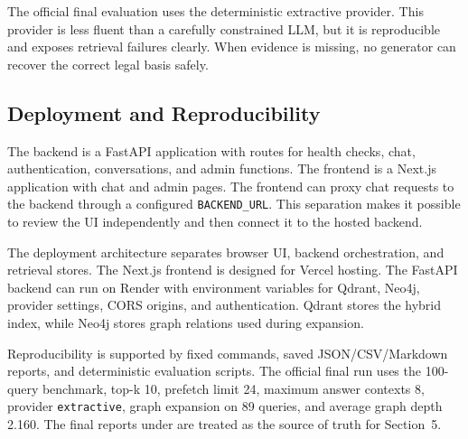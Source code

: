 The official final evaluation uses the deterministic extractive provider. This provider is less fluent than a carefully constrained LLM, but it is reproducible and exposes retrieval failures clearly. When evidence is missing, no generator can recover the correct legal basis safely.

\subsection{Deployment and Reproducibility}
The backend is a FastAPI application with routes for health checks, chat, authentication, conversations, and admin functions. The frontend is a Next.js application with chat and admin pages. The frontend can proxy chat requests to the backend through a configured \texttt{BACKEND\_URL}. This separation makes it possible to review the UI independently and then connect it to the hosted backend.

The deployment architecture separates browser UI, backend orchestration, and retrieval stores. The Next.js frontend is designed for Vercel hosting. The FastAPI backend can run on Render with environment variables for Qdrant, Neo4j, provider settings, CORS origins, and authentication. Qdrant stores the hybrid index, while Neo4j stores graph relations used during expansion.


Reproducibility is supported by fixed commands, saved JSON/CSV/Markdown reports, and deterministic evaluation scripts. The official final run uses the 100-query benchmark, top-k 10, prefetch limit 24, maximum answer contexts 8, provider \texttt{extractive}, graph expansion on 89 queries, and average graph depth 2.160. The final reports under  are treated as the source of truth for Section~5.
